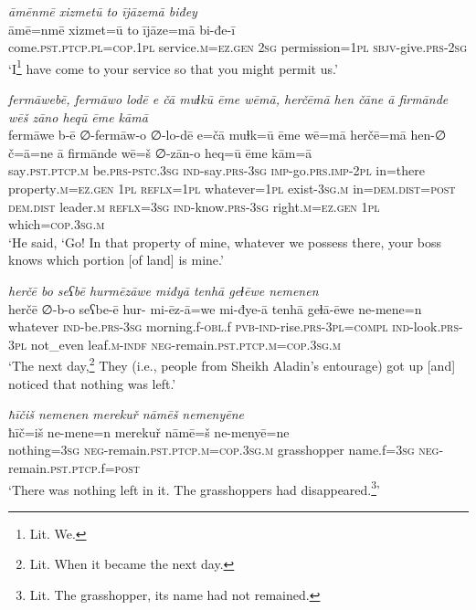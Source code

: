 \ea \label{PM.15}
\textit{āmēnmē xizmetū to ījāzemā biđey} \\ 
\gll āmē=nmē xizmet=ū to ījāze=mā bi-đe-ī \\ 
 come\textsc{.pst}\textsc{.ptcp}\textsc{.pl}\textsc{=cop}\textsc{.1pl} service\textsc{.m}\textsc{\textsc{=ez.gen}} \textsc{2sg} permission\textsc{=1pl} \textsc{sbjv-}give\textsc{.prs}-\textsc{2sg} \\ 
\glt `I\footnote{Lit. We.} have come to your service so that you might permit us.'
\z 
 
\ea \label{PM.20}
\textit{fermāwebē, fermāwo lodē e čā muɫkū ēme wēmā, herčēmā hen čāne ā firmānde wēš zāno heqū ēme kāmā} \\ 
\gll fermāwe b-ē ∅-fermāw-o ∅-lo-dē e=čā muɫk=ū ēme wē=mā herčē=mā hen-∅ č=ā=ne ā firmānde wē=š ∅-zān-o heq=ū ēme kām=ā \\ 
 say\textsc{.pst}\textsc{.ptcp}\textsc{.m} be\textsc{.prs}\textsc{-pstc}\textsc{.3sg} \textsc{ind-}say\textsc{.prs}\textsc{-3sg} \textsc{imp-}go\textsc{.prs}.\textsc{imp-}\textsc{2pl} in=there property\textsc{.m}\textsc{\textsc{=ez.gen}} \textsc{1pl} \textsc{reflx}\textsc{=1pl} whatever\textsc{=1pl} exist\textsc{-3sg}\textsc{.m} in=\textsc{dem.dist}\textsc{=\textsc{post}} \textsc{dem.dist} leader\textsc{.m} \textsc{reflx}\textsc{=3sg} \textsc{ind-}know\textsc{.prs}\textsc{-3sg} right\textsc{.m}\textsc{\textsc{=ez.gen}} \textsc{1pl} which\textsc{=cop}\textsc{.3sg}\textsc{.m} \\ 
\glt `He said, ‘Go! In that property of mine, whatever we possess there, your boss knows which portion [of land] is mine.'
\z 
 
\ea \label{PM.24}
\textit{herčē bo seʕbē hurmēzāwe miđyā tenhā geɫēwe nemenen} \\ 
\gll herčē ∅-b-o seʕbe-ē hur- mi-ēz-ā=we mi-đye-ā tenhā geɫā-ēwe ne-mene=n \\ 
 whatever \textsc{ind-}be\textsc{.prs}\textsc{-3sg} morning.f\textsc{-obl}.f \textsc{pvb-}\textsc{ind-}rise\textsc{.prs}\textsc{-3pl}\textsc{=compl} \textsc{ind-}look\textsc{.prs}\textsc{-3pl} not\_even leaf\textsc{.m}\textsc{-indf} \textsc{neg-}remain\textsc{.pst}\textsc{.ptcp}\textsc{.m}\textsc{=cop}\textsc{.3sg}\textsc{.m} \\ 
\glt `The next day,\footnote{Lit. When it became the next day.} They (i.e., people from Sheikh Aladin’s entourage) got up [and] noticed that nothing was left.'
\z 
 
\ea \label{PM.26}
\textit{ħīčiš nemenen merekuř nāmēš nemenyēne} \\ 
\gll ħīč=iš ne-mene=n merekuř nāmē=š ne-menyē=ne \\ 
 nothing\textsc{=3sg} \textsc{neg-}remain\textsc{.pst}\textsc{.ptcp}\textsc{.m}\textsc{=cop}\textsc{.3sg}\textsc{.m} grasshopper name.f\textsc{=3sg} \textsc{neg-}remain\textsc{.pst}\textsc{.ptcp}.f\textsc{=\textsc{post}} \\ 
\glt `There was nothing left in it. The grasshoppers had disappeared.\footnote{Lit. The grasshopper, its name had not remained.}'
\z 
 
